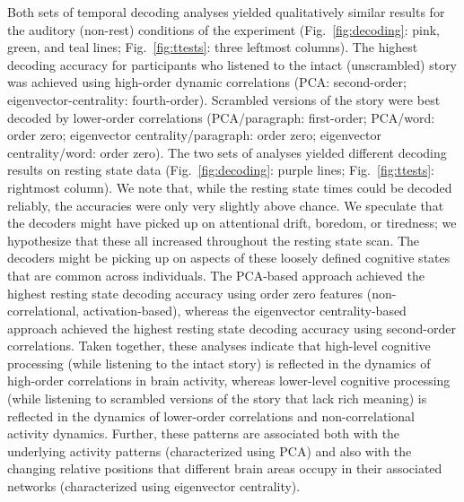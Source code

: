 \documentclass[english]{article}
\begin{document}
Both sets of temporal decoding analyses yielded qualitatively similar
results for the auditory (non-rest) conditions of the experiment
(Fig.~\ref{fig:decoding}: pink, green, and teal lines;
Fig.~\ref{fig:ttests}: three leftmost columns).  The highest
decoding accuracy for participants who listened to the intact
(unscrambled) story was achieved using high-order dynamic correlations
(PCA: second-order; eigenvector-centrality: fourth-order).  Scrambled
versions of the story were best decoded by lower-order correlations
(PCA/paragraph: first-order; PCA/word: order zero; eigenvector
centrality/paragraph: order zero; eigenvector centrality/word: order
zero).  The two sets of analyses yielded different decoding results on
resting state data (Fig.~\ref{fig:decoding}: purple lines;
Fig.~\ref{fig:ttests}: rightmost column).  We note
that, while the resting state times could be decoded reliably, the
accuracies were only very slightly above chance.  We speculate that
the decoders might have picked up on attentional drift, boredom, or
tiredness; we hypothesize that these all increased throughout the resting
state scan.  The decoders might be picking up on aspects of these
loosely defined cognitive states that are common across individuals.
The PCA-based approach achieved the highest resting state decoding
accuracy using order zero features (non-correlational,
activation-based), whereas the eigenvector centrality-based approach
achieved the highest resting state decoding accuracy using
second-order correlations.  Taken together, these analyses indicate
that high-level cognitive processing (while listening to the intact
story) is reflected in the dynamics of high-order correlations in
brain activity, whereas lower-level cognitive processing (while
listening to scrambled versions of the story that lack rich meaning)
is reflected in the dynamics of lower-order correlations and
non-correlational activity dynamics.  Further, these patterns are
associated both with the underlying activity patterns (characterized
using PCA) and also with the changing relative positions that
different brain areas occupy in their associated networks
(characterized using eigenvector centrality).
\end{document}
